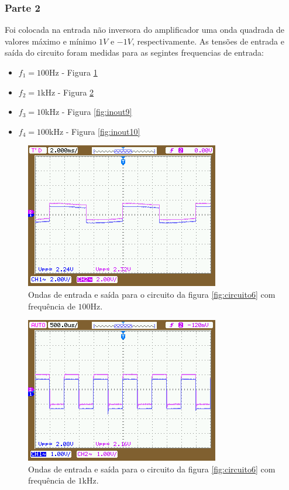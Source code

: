 \documentclass{abntex2}
\begin{document}
\subsubsection{Parte 2}

Foi colocada na entrada não inversora do amplificador uma onda quadrada de valores máximo e mínimo $1V$ e $-1V$, respectivamente. As tensões de entrada e saída do circuito foram medidas para as segintes frequencias de entrada:
\begin{itemize}
  \item $f_1 = 100$Hz - Figura \ref{fig:inout7}
  \item $f_2 = 1$kHz - Figura \ref{fig:inout8}
  \item $f_3 = 10$kHz - Figura \ref{fig:inout9}
  \item $f_4 = 100$kHz - Figura \ref{fig:inout10}
\end{itemize}

\begin{figure}[h]
  \centering
  \includegraphics[scale = 0.5]{NewFile7.png}
  \caption{Ondas de entrada e saída para o circuito da figura \ref{fig:circuito6} com frequência de $100$Hz.}
  \label{fig:inout7}
\end{figure}

\begin{figure}[h]
  \centering
  \includegraphics[scale = 0.5]{NewFile8.png}
  \caption{Ondas de entrada e saída para o circuito da figura \ref{fig:circuito6} com frequência de $1$kHz.}
  \label{fig:inout8}
\end{figure}
\end{document}
